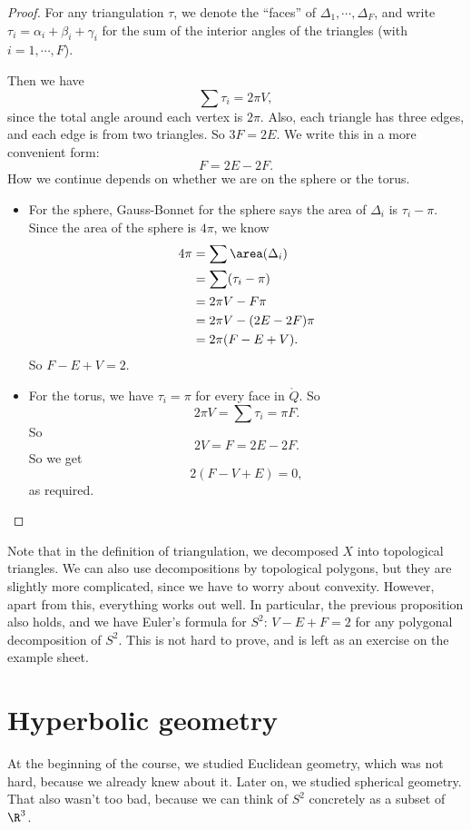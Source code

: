 \documentclass[a4paper]{article}
\begin{document}
\begin{proof}
  For any triangulation $\tau$, we denote the ``faces'' of $\Delta_1, \cdots, \Delta_F$, and write $\tau_i = \alpha_i + \beta_i + \gamma_i$ for the sum of the interior angles of the triangles (with $i = 1, \cdots, F$).

  Then we have
  \[
    \sum \tau_i = 2 \pi V,
  \]
  since the total angle around each vertex is $2\pi$. Also, each triangle has three edges, and each edge is from two triangles. So $3F = 2E$. We write this in a more convenient form:
  \[
    F = 2E - 2F.
  \]
  How we continue depends on whether we are on the sphere or the torus.
  \begin{itemize}
    \item For the sphere, Gauss-Bonnet for the sphere says the area of $\Delta_i$ is $\tau_i - \pi$. Since the area of the sphere is $4\pi$, we know
      \begin{align*}
        4\pi &= \sum \area(\Delta_i) \\
        &= \sum (\tau_i - \pi) \\
        &= 2\pi V - F\pi \\
        &= 2\pi V - (2E - 2F)\pi \\
        &= 2\pi (F - E + V).
      \end{align*}
      So $F - E + V = 2$.
    \item For the torus, we have $\tau_i = \pi$ for every face in $\mathring{Q}$. So
      \[
        2\pi V = \sum \tau_i = \pi F.
      \]
      So
      \[
        2V = F = 2E - 2F.
      \]
      So we get
      \[
        2(F - V + E) = 0,
      \]
      as required.
  \end{itemize}
\end{proof}
Note that in the definition of triangulation, we decomposed $X$ into topological triangles. We can also use decompositions by topological polygons, but they are slightly more complicated, since we have to worry about convexity. However, apart from this, everything works out well. In particular, the previous proposition also holds, and we have Euler's formula for $S^2$: $V - E + F = 2$ for any polygonal decomposition of $S^2$. This is not hard to prove, and is left as an exercise on the example sheet.

\section{Hyperbolic geometry}
At the beginning of the course, we studied Euclidean geometry, which was not hard, because we already knew about it. Later on, we studied spherical geometry. That also wasn't too bad, because we can think of $S^2$ concretely as a subset of $\R^3$.
\end{document}
